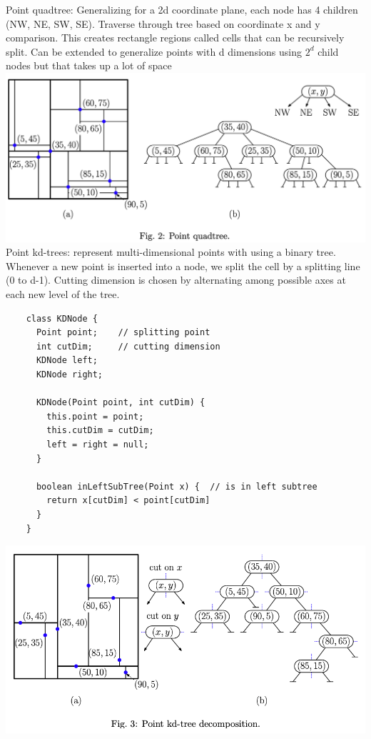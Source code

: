 \documentclass{article}
\begin{document}
  \newpage
  \noindent Point quadtree: Generalizing for a 2d coordinate plane, each node has 4 children (NW, NE, SW, SE). Traverse through tree based on coordinate x and y comparison. This creates rectangle regions called cells that can be recursively split. Can be extended to generalize points with d dimensions using $2^{d}$ child nodes but that takes up a lot of space\\
  \includegraphics[width=\textwidth]{PointQuadtree}
  Point kd-trees: represent multi-dimensional points with using a binary tree. Whenever a new point is inserted into a node, we split the cell by a splitting line (0 to d-1). Cutting dimension is chosen by alternating among possible axes at each new level of the tree. 
  \begin{lstlisting}
    class KDNode {
      Point point;    // splitting point
      int cutDim;     // cutting dimension
      KDNode left;
      KDNode right;

      KDNode(Point point, int cutDim) {
        this.point = point;
        this.cutDim = cutDim;
        left = right = null;
      }

      boolean inLeftSubTree(Point x) {  // is in left subtree
        return x[cutDim] < point[cutDim]
      }
    }
  \end{lstlisting}
  \includegraphics[width=\textwidth]{PointKDTree}
\end{document}
